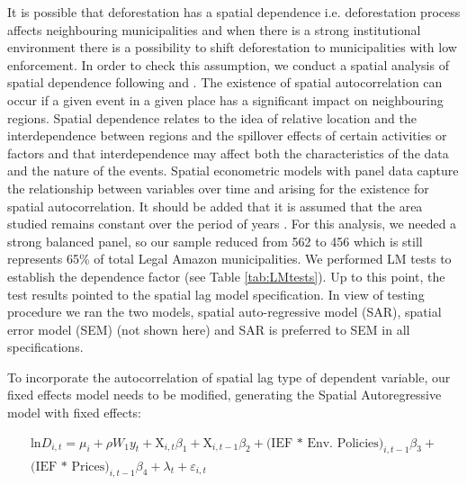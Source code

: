 It is possible that deforestation has a spatial dependence i.e. deforestation process affects neighbouring municipalities and when there is a strong institutional environment there is a possibility to shift deforestation to municipalities with low enforcement. In order to check this assumption, we conduct a spatial analysis of spatial dependence following \citet{ANSELIN} and \citet{elhorst_2012}. The existence of spatial autocorrelation can occur if a given event in a given place has a significant impact on neighbouring regions. Spatial dependence relates to the idea of relative location and the interdependence between regions and the spillover effects of certain activities or factors and that interdependence may affect both the characteristics of the data and the nature of the events. Spatial econometric models with panel data capture the relationship between variables over time and arising for the existence for spatial autocorrelation. It should be added that it is assumed that the area studied remains constant over the period of years \citep{ALMEIDA}. 
For this analysis, we needed a strong balanced panel, so our sample reduced from 562 to 456 which is still represents 65\% of total Legal Amazon municipalities. We performed LM tests to establish the dependence factor (see Table \ref{tab:LMtests}). Up to this point, the test results pointed to the spatial lag model specification. In view of testing procedure we ran the two models, spatial auto-regressive model (SAR), spatial error model (SEM) (not shown here) and SAR is preferred to SEM in all specifications. 

To incorporate the autocorrelation of spatial lag type of dependent variable, our fixed effects model needs to be modified, generating the Spatial Autoregressive model with fixed effects:


\begin{equation}
\begin{gathered}
\text{ln}D_{i,t} = \mu_{i} + \rho W_{1}y_{t} +  \text{X}_{i,t}\beta_{1} + \text{X}_{i,t-1}\beta_{2}  + \text{(IEF * Env. Policies)}_{i,t-1} \beta_{3} + \\ \text{(IEF * Prices)}_{i,t-1}  \beta_{4} + \lambda_{t} + \varepsilon_{i,t} \label{eq:2} 
\end{gathered}
\end{equation}

